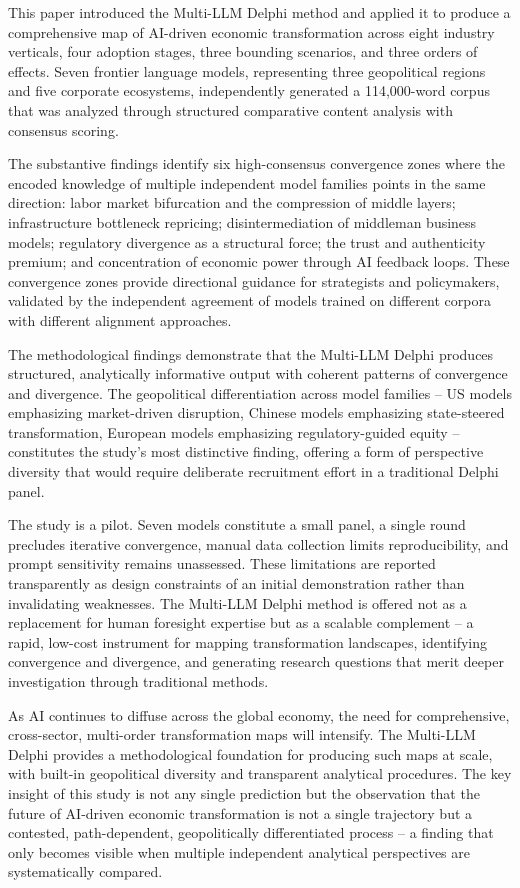 \documentclass{article}
\begin{document}
This paper introduced the Multi-LLM Delphi method and applied it to produce a comprehensive map of AI-driven economic transformation across eight industry verticals, four adoption stages, three bounding scenarios, and three orders of effects. Seven frontier language models, representing three geopolitical regions and five corporate ecosystems, independently generated a 114,000-word corpus that was analyzed through structured comparative content analysis with consensus scoring.

The substantive findings identify six high-consensus convergence zones where the encoded knowledge of multiple independent model families points in the same direction: labor market bifurcation and the compression of middle layers; infrastructure bottleneck repricing; disintermediation of middleman business models; regulatory divergence as a structural force; the trust and authenticity premium; and concentration of economic power through AI feedback loops. These convergence zones provide directional guidance for strategists and policymakers, validated by the independent agreement of models trained on different corpora with different alignment approaches.

The methodological findings demonstrate that the Multi-LLM Delphi produces structured, analytically informative output with coherent patterns of convergence and divergence. The geopolitical differentiation across model families -- US models emphasizing market-driven disruption, Chinese models emphasizing state-steered transformation, European models emphasizing regulatory-guided equity -- constitutes the study's most distinctive finding, offering a form of perspective diversity that would require deliberate recruitment effort in a traditional Delphi panel.

The study is a pilot. Seven models constitute a small panel, a single round precludes iterative convergence, manual data collection limits reproducibility, and prompt sensitivity remains unassessed. These limitations are reported transparently as design constraints of an initial demonstration rather than invalidating weaknesses. The Multi-LLM Delphi method is offered not as a replacement for human foresight expertise but as a scalable complement -- a rapid, low-cost instrument for mapping transformation landscapes, identifying convergence and divergence, and generating research questions that merit deeper investigation through traditional methods.

As AI continues to diffuse across the global economy, the need for comprehensive, cross-sector, multi-order transformation maps will intensify. The Multi-LLM Delphi provides a methodological foundation for producing such maps at scale, with built-in geopolitical diversity and transparent analytical procedures. The key insight of this study is not any single prediction but the observation that the future of AI-driven economic transformation is not a single trajectory but a contested, path-dependent, geopolitically differentiated process -- a finding that only becomes visible when multiple independent analytical perspectives are systematically compared.
\end{document}
